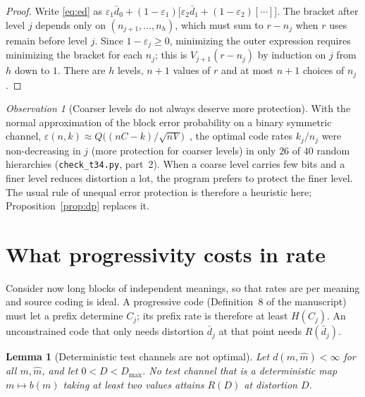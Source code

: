 \documentclass[11pt]{article}
\newtheorem{lemma}[theorem]{Lemma}
\theoremstyle{definition}
\theoremstyle{remark}
\newtheorem{observation}{Observation}
\begin{document}
\begin{proof}
Write \eqref{eq:ed} as $\varepsilon_1\bar d_0+(1-\varepsilon_1)\big[\varepsilon_2\bar d_1+(1-\varepsilon_2)[\cdots]\big]$. The bracket after level $j$ depends only on $(n_{j+1},\dots,n_h)$, which must sum to $r-n_j$ when $r$ uses remain before level $j$. Since $1-\varepsilon_j\ge0$, minimizing the outer expression requires minimizing the bracket for each $n_j$; this is $V_{j+1}(r-n_j)$ by induction on $j$ from $h$ down to $1$. There are $h$ levels, $n+1$ values of $r$ and at most $n+1$ choices of $n_j$.
\end{proof}

\begin{observation}[Coarser levels do not always deserve more protection]\label{obs:mono}
With the normal approximation of the block error probability on a binary symmetric channel, $\varepsilon(n,k)\approx Q\big((nC-k)/\sqrt{nV}\big)$~\cite{polyanskiy2010}, the optimal code rates $k_j/n_j$ were non-decreasing in $j$ (more protection for coarser levels) in only $26$ of $40$ random hierarchies (\texttt{check\_t34.py}, part~2). When a coarse level carries few bits and a finer level reduces distortion a lot, the program prefers to protect the finer level. The usual rule of unequal error protection is therefore a heuristic here; Proposition~\ref{prop:dp} replaces it.
\end{observation}

\section{What progressivity costs in rate}\label{sec:cost}

Consider now long blocks of independent meanings, so that rates are per meaning and source coding is ideal. A progressive code (Definition~8 of the manuscript) must let a prefix determine $C_j$; its prefix rate is therefore at least $H(C_j)$. An unconstrained code that only needs distortion $\bar d_j$ at that point needs $R(\bar d_j)$.

\begin{lemma}[Deterministic test channels are not optimal]\label{lem:det}
Let $d(m,\hat m)<\infty$ for all $m,\hat m$, and let $0<D<D_{\max}$. No test channel that is a deterministic map $m\mapsto b(m)$ taking at least two values attains $R(D)$ at distortion $D$.
\end{lemma}
\end{document}
